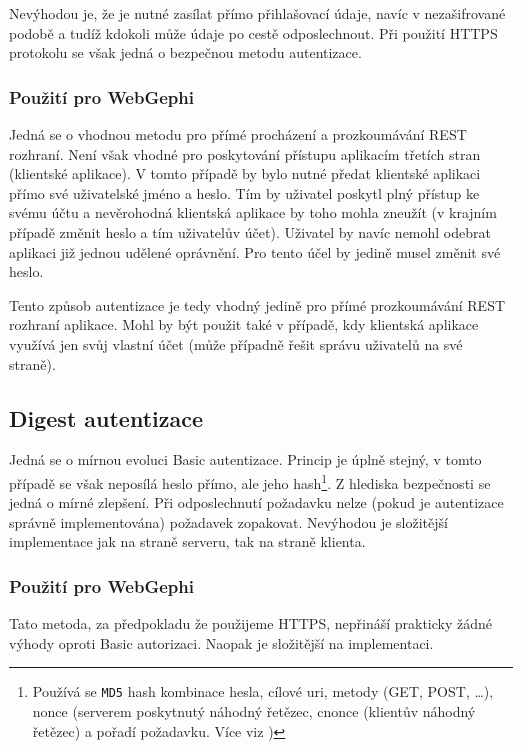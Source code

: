 \documentclass[thesis=M,czech]{FITthesis}[2014/05/6]
\begin{document}
Nevýhodou je, že je nutné zasílat přímo přihlašovací údaje, navíc v nezašifrované podobě a tudíž kdokoli může údaje po cestě odposlechnout. Při použití HTTPS protokolu se však
jedná o bezpečnou metodu autentizace.

\subsubsection{Použití pro WebGephi}
Jedná se o vhodnou metodu pro přímé procházení a prozkoumávání REST rozhraní. Není však vhodné pro poskytování přístupu aplikacím třetích stran (klientské aplikace).
V tomto případě by bylo nutné předat klientské aplikaci přímo své uživatelské jméno a heslo. Tím by uživatel poskytl plný přístup ke svému účtu a nevěrohodná klientská
aplikace by toho mohla zneužít (v krajním případě změnit heslo a tím  uživatelův účet). Uživatel by navíc nemohl odebrat aplikaci již jednou udělené oprávnění. 
Pro tento účel by jedině musel změnit své heslo.

Tento způsob autentizace je tedy vhodný jedině pro přímé prozkoumávání REST rozhraní aplikace. Mohl by být použit také v případě,
kdy klientská aplikace využívá jen svůj vlastní účet (může případně řešit správu uživatelů na své straně). 

\subsection{Digest autentizace\cite{wiki:digest}}
Jedná se o mírnou evoluci Basic autentizace. Princip je úplně stejný, v tomto případě se však neposílá heslo přímo, ale jeho hash\footnote{Používá se \texttt{MD5} hash kombinace hesla, cílové uri, metody (GET, POST, \ldots), nonce (serverem 
poskytnutý náhodný řetězec, cnonce (klientův náhodný řetězec) a pořadí požadavku. Více viz \cite{wiki:digest})}.
Z hlediska bezpečnosti se jedná o mírné zlepšení. Při odposlechnutí požadavku nelze (pokud je autentizace správně implementována) požadavek zopakovat.
Nevýhodou je složitější implementace jak na straně serveru, tak na straně klienta.

\subsubsection{Použití pro WebGephi}
Tato metoda, za předpokladu že použijeme HTTPS, nepřináší prakticky žádné výhody oproti Basic autorizaci. Naopak je složitější na implementaci.
\end{document}
